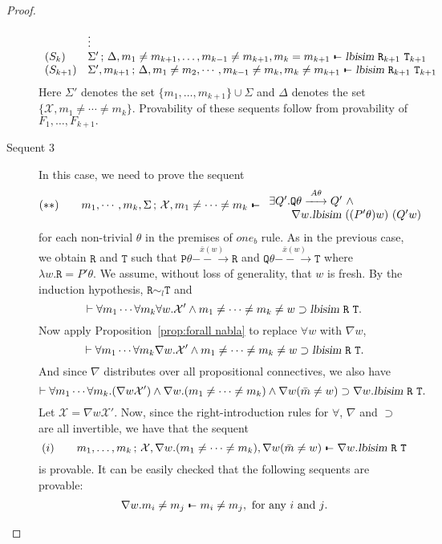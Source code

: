 \documentclass{acmtrans2m}
\def\Xscr{{\mathcal X}}
\def\Ppi{{\mathtt P}}
\def\Qpi{{\mathtt Q}}
\def\Rpi{{\mathtt R}}
\def\Tpi{{\mathtt T}}
\def\relbar{\mathrel{\smash-}}
\def\joinrelm{\mathrel{\mkern-3.2mu}}
\def\tailpiece{\kern 1pt\vrule height 1ex width 0.3ex depth -.25ex}
\def\seqsym{\mathrel{\tailpiece\joinrelm\relbar}}
\newcommand{\NSeq}[3]{#1\,;\,#2 \seqsym #3}
\newcommand{\lbisim}[2]{\hbox{\sl lbisim}~#1~#2}
\newcommand{\oimp}{\supset}
\newcommand{\one  }[3]{#1\stackrel{#2}{-\!\!-\!\!\!\rightarrow    } #3}
\begin{document}
\begin{proof}
\begin{description}
$$\begin{array}{ll}
 & \vdots \\
(S_k) & \NSeq{\Sigma'}{\Delta, m_1 \not = m_{k+1}, \ldots, m_{k-1} \not = m_{k+1}, m_k = m_{k+1}}
   {\lbisim{\Rpi_{k+1}}{\Tpi_{k+1}}} \\
(S_{k+1}) & \NSeq{\Sigma', m_{k+1}}{\Delta,
m_1 \not = m_{2}, \cdots, m_{k-1} \not = m_{k}, m_k \not = m_{k+1}}
   {\lbisim{\Rpi_{k+1}}{\Tpi_{k+1}}} \\
\end{array}
$$
Here $\Sigma'$ denotes the set $\{m_1, \ldots, m_{k+1}\} \cup \Sigma$ and
$\Delta$ denotes the set $\{\Xscr, m_1 \not = \cdots \not = m_k \}.$
Provability of these sequents follow from provability of $F_1, \ldots, F_{k+1}.$

\item[Sequent 3] In this case, we need to prove the sequent
$$
(**) \qquad \NSeq{m_1, \cdots, m_k, \Sigma}{\Xscr, m_1 \not = \cdots \not = m_k}
{
\begin{array}{l}
\exists Q'. \one{\Qpi\theta}{A\theta}{Q'} ~ \land \\
\qquad \nabla w. \lbisim{((P'\theta) w)}{(Q' w)}
\end{array}
}
$$
for each non-trivial $\theta$ in the premises of $one_b$ rule. As in the previous case, we obtain
$\Rpi$ and $\Tpi$ such that
$
\one{\Ppi \theta}{\bar x(w)}{\Rpi}
$
and
$
\one{\Qpi \theta}{\bar x(w)}{\Tpi}
$
where $\lambda w.\Rpi = P'\theta.$ We assume, without loss of generality, that $w$ is fresh.
By the induction hypothesis, $\Rpi \sim_l \Tpi$ and 
$$
\vdash\forall m_1 \cdots \forall m_k \forall w. \Xscr' \land m_1 \not = \cdots \not = m_k \not = w \oimp 
\lbisim{\Rpi}{\Tpi}.
$$
Now apply Proposition~\ref{prop:forall nabla} to replace $\forall w$ with $\nabla w$,
$$
\vdash\forall m_1 \cdots \forall m_k \nabla w. \Xscr' \land m_1 \not = \cdots \not = m_k \not = w \oimp 
\lbisim{\Rpi}{\Tpi}.
$$
And since $\nabla$ distributes over all propositional connectives, we also have
$$
\vdash\forall m_1 \cdots \forall m_k.  (\nabla w \Xscr') \land \nabla w. (m_1 \not = \cdots \not = m_k) \land 
\nabla w (\bar m \not = w) \oimp \nabla w. \lbisim{\Rpi}{\Tpi}.
$$
Let $\Xscr = \nabla w \Xscr'$.
Now, since the right-introduction rules for $\forall$, $\nabla$ and $\oimp$ are all invertible,
we have that the sequent
$$
(i) \qquad \NSeq{m_1,\ldots,m_k}{\Xscr, \nabla w. (m_1 \not = \cdots \not = m_k), 
\nabla w (\bar m \not = w)}{\nabla w. \lbisim{\Rpi}{\Tpi}}
$$
is provable. It can be easily checked that the following sequents are provable:
$$
\begin{array}{l}
\nabla w. m_i \not = m_j \seqsym m_i \not = m_j, \hbox{ for any $i$ and $j$.} \\

\end{array}$$
\end{description}
\end{proof}
\end{document}
